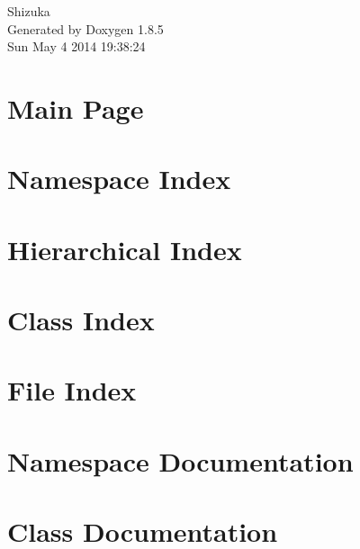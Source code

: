 \documentclass[twoside]{book}
\newcommand{\clearemptydoublepage}{%
  \newpage{\pagestyle{empty}\cleardoublepage}%
}
\begin{document}
\hypersetup{pageanchor=false}
\begin{titlepage}
\vspace*{7cm}
\begin{center}%
{\Large Shizuka }\\
\vspace*{1cm}
{\large Generated by Doxygen 1.8.5}\\
\vspace*{0.5cm}
{\small Sun May 4 2014 19:38:24}\\
\end{center}
\end{titlepage}
\clearemptydoublepage
\tableofcontents
\clearemptydoublepage
{}
\hypersetup{pageanchor=true}

\chapter{Main Page}
\label{index}\hypertarget{index}{}
\chapter{Namespace Index}

\chapter{Hierarchical Index}

\chapter{Class Index}

\chapter{File Index}

\chapter{Namespace Documentation}









\chapter{Class Documentation}







\end{document}
